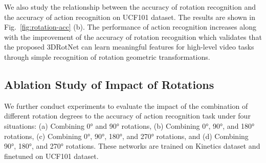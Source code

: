 \documentclass[10pt,twocolumn,letterpaper]{article}
\begin{document}
We also study the relationship between the accuracy of rotation recognition and the accuracy of action recognition on UCF101 dataset. The results are shown in Fig.~\ref{fig:rotation-acc} (b). The performance of action recognition increases along with the improvement of the accuracy of rotation recognition which validates that the proposed 3DRotNet can learn meaningful features for high-level video tasks through simple recognition of rotation geometric transformations.

\subsection{Ablation Study of Impact of Rotations}

We further conduct experiments to evaluate the impact of the combination of different rotation degrees to the accuracy of action recognition task under four situations: (a) Combining \ang{0} and \ang{90} rotations, (b) Combining \ang{0}, \ang{90}, and \ang{180} rotations, (c) Combining \ang{0}, \ang{90}, \ang{180}, and \ang{270} rotations, and (d) Combining \ang{90}, \ang{180}, and \ang{270} rotations. These networks are trained on Kinetics dataset and finetuned on UCF101 dataset. 

\begin{table}[ht]
\centering
{}
\vspace{2mm}
\caption{The comparison of the performance of networks to recognize different number of rotations on UCF101 dataset. The network that recognizes  rotation degrees has the best performance among all the networks.} 
\label{tab:rotation_ablation}
\end{table}
\end{document}
